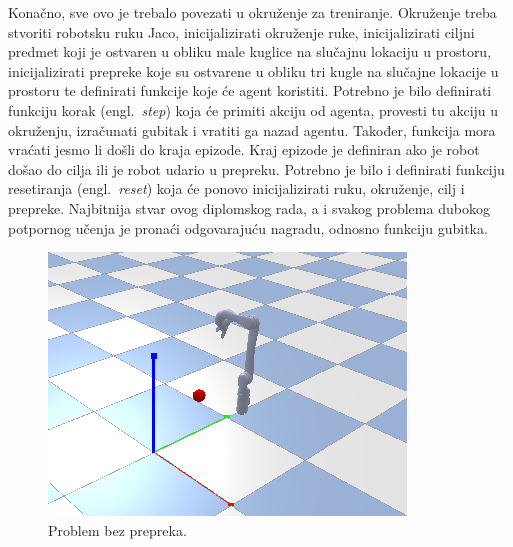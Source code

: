 \documentclass[times,utf8,diplomski]{fer}
\begin{document}
Konačno, sve ovo je trebalo povezati u okruženje za treniranje. Okruženje treba stvoriti robotsku ruku Jaco, inicijalizirati okruženje ruke, inicijalizirati ciljni predmet koji je ostvaren u obliku male kuglice na slučajnu lokaciju u prostoru, inicijalizirati prepreke koje su ostvarene u obliku tri kugle na slučajne lokacije u prostoru te definirati funkcije koje će agent koristiti. Potrebno je bilo definirati funkciju korak (engl.~\emph{step}) koja će primiti akciju od agenta, provesti tu akciju u okruženju, izračunati gubitak i vratiti ga nazad agentu. Također, funkcija mora vraćati jesmo li došli do kraja epizode. Kraj epizode je definiran ako je robot došao do cilja ili je robot udario u prepreku. Potrebno je bilo i definirati funkciju resetiranja (engl.~\emph{reset}) koja će ponovo inicijalizirati ruku, okruženje, cilj i prepreke. Najbitnija stvar ovog diplomskog rada, a i svakog problema dubokog potpornog učenja je pronaći odgovarajuću nagradu, odnosno funkciju gubitka. 


\begin{figure}[ht!]
	\centering
	\includegraphics[width=\columnwidth]{img/bezprepreka.png}
	\caption{Problem bez prepreka.}
	\label{fig:bezprepeka}
\end{figure}
\end{document}
